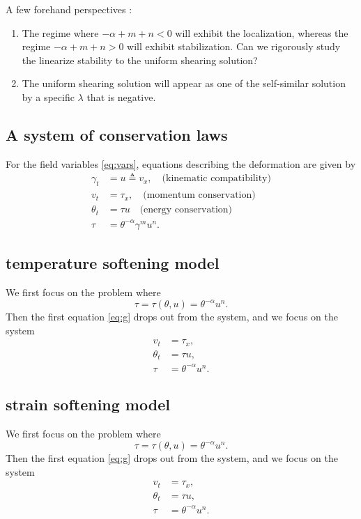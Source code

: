 \documentclass[a4paper,11pt]{article}
\def\blue{\color{blue}}
\begin{document}
A few forehand perspectives :
\begin{enumerate}
 \item The regime where $-\alpha+m+n <0$ will exhibit the localization, whereas the regime $-\alpha+m+n > 0$ will exhibit stabilization. {\blue Can we rigorously study the linearize stability to the uniform shearing solution?}
 \item The uniform shearing solution will appear as one of the self-similar solution by a specific $\lambda$ that is negative.
\end{enumerate}
\subsection{A system of conservation laws}
For the field variables \eqref{eq:vars}, equations describing the deformation are given by
\begin{align}
 \gamma_t &= u\triangleq v_x, \quad \text{(kinematic compatibility)} 	\label{eq:g}\\
 v_t &= \tau_x, \quad \text{(momentum conservation)} 	\label{eq:v}\\
 \theta_t &= \tau u \quad \text{(energy conservation)}	\label{eq:th}\\
 \tau &=\theta^{-\alpha}\gamma^m u^n.			\label{eq:tau}
\end{align}

\subsection{temperature softening model}
We first focus on the problem where 
$$ \tau = \tau(\theta,u) = \theta^{-\alpha}u^n.$$
Then the first equation \eqref{eq:g} drops out from the system, and we focus on the system
\begin{equation} \label{eq:orisys}
 \begin{aligned}
  v_t &= \tau_x,\\
  \theta_t &= \tau u,\\
  \tau &=\theta^{-\alpha}u^n.
 \end{aligned}
\end{equation}

\subsection{strain softening model}
We first focus on the problem where 
$$ \tau = \tau(\theta,u) = \theta^{-\alpha}u^n.$$
Then the first equation \eqref{eq:g} drops out from the system, and we focus on the system
\begin{equation} \label{eq:orisys}
 \begin{aligned}
  v_t &= \tau_x,\\
  \theta_t &= \tau u,\\
  \tau &=\theta^{-\alpha}u^n.
 \end{aligned}
\end{equation}
\end{document}
